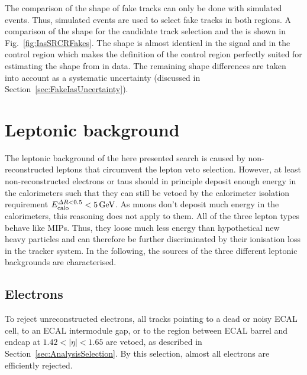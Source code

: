 The comparison of the \ias shape of fake tracks can only be done with simulated events.
Thus, simulated \WJets events are used to select fake tracks in both regions.
A comparison of the shape for the candidate track selection and the \fakeCR is shown in Fig.~\ref{fig:IasSRCRFakes}.
The \ias shape is almost identical in the signal and in the control region which makes the definition of the control region perfectly suited for estimating the \ias shape from \fakeCR in data.
The remaining shape differences are taken into account as a systematic uncertainty (discussed in Section~\ref{sec:FakeIasUncertainty}).
\FloatBarrier
\section{Leptonic background}
\label{sec:LeptonicBkg}

The leptonic background of the here presented search is caused by non-reconstructed leptons that circumvent the lepton veto selection.
However, at least non-reconstructed electrons or taus should in principle deposit enough energy in the calorimeters such that they can still be vetoed by the calorimeter isolation requirement $E^{\Delta R<0.5}_{\text{calo}}<5\,\text{Ge}\kern-0.06667em\text{V}$.
As muons don't deposit much energy in the calorimeters, this reasoning does not apply to them.
All of the three lepton types behave like MIPs.
Thus, they loose much less energy than hypothetical new heavy particles and can therefore be further discriminated by their ionisation loss in the tracker system.
In the following, the sources of the three different leptonic backgrounds are characterised.

\subsection*{Electrons}
To reject unreconstructed electrons, all tracks pointing to a dead or noisy ECAL cell, to an ECAL intermodule gap, or to the region between ECAL barrel and endcap at $1.42<|\eta|<1.65$ are vetoed, as described in Section~\ref{sec:AnalysisSelection}.
By this selection, almost all electrons are efficiently rejected.

